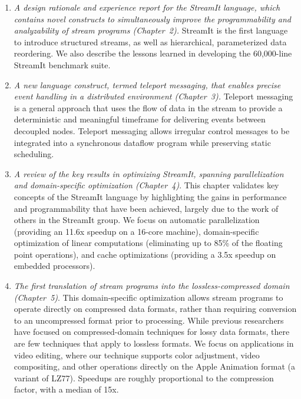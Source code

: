 \begin{enumerate}

\item {\it A design rationale and experience report for the StreamIt
  language, which contains novel constructs to simultaneously improve
  the programmability and analyzability of stream programs
  (Chapter~2).}  StreamIt is the first language to introduce
  structured streams, as well as hierarchical, parameterized data
  reordering.  We also describe the lessons learned in developing the
  60,000-line StreamIt benchmark suite.

\item {\it A new language construct, termed teleport messaging, that
  enables precise event handling in a distributed environment
  (Chapter~3).}  Teleport messaging is a general approach that uses
  the flow of data in the stream to provide a deterministic and
  meaningful timeframe for delivering events between decoupled nodes.
  Teleport messaging allows irregular control messages to be
  integrated into a synchronous dataflow program while preserving
  static scheduling.

\item {\it A review of the key results in optimizing StreamIt,
  spanning parallelization and domain-specific optimization
  (Chapter~4)}.  This chapter validates key concepts of the StreamIt
  language by highlighting the gains in performance and
  programmability that have been achieved, largely due to the work of
  others in the StreamIt group.  We focus on automatic parallelization
  (providing an 11.6x speedup on a 16-core machine), domain-specific
  optimization of linear computations (eliminating up to 85\% of the
  floating point operations), and cache optimizations (providing a
  3.5x speedup on embedded processors).

\item {\it The first translation of stream programs into the
  lossless-compressed domain (Chapter~5)}.  This domain-specific
  optimization allows stream programs to operate directly on
  compressed data formats, rather than requiring conversion to an
  uncompressed format prior to processing.  While previous researchers
  have focused on compressed-domain techniques for lossy data formats,
  there are few techniques that apply to lossless formats.  We focus
  on applications in video editing, where our technique supports color
  adjustment, video compositing, and other operations directly on the
  Apple Animation format (a variant of LZ77).  Speedups are roughly
  proportional to the compression factor, with a median of 15x.


\end{enumerate}
